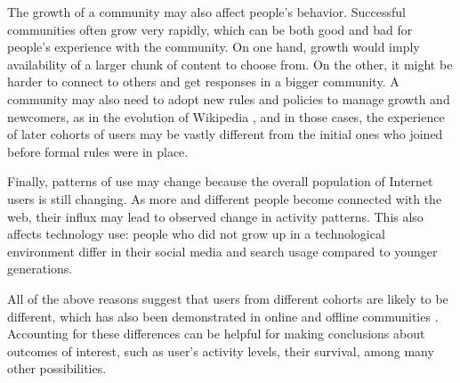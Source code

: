 The growth of a community may also affect people's behavior. Successful communities often grow very rapidly, which can be both good and bad for people's experience with the community. On one hand, growth would imply availability of a larger chunk of content to choose from. On the other, it might be harder to connect to others and get responses in a bigger community. A community may also need to adopt new rules and policies to manage growth and newcomers, as in the evolution of Wikipedia \cite{Choi2010,Bryant2005}, and in those cases, the experience of later cohorts of users may be vastly different from the initial ones who joined before formal rules were in place. 

Finally, patterns of use may change because the overall population of Internet users is still changing. As more and different people become connected with the web, their influx may lead to observed change in activity patterns.  This also affects technology use: people who did not grow up in a technological environment differ in their social media and search usage compared to younger generations\cite{Correa2010,Beldona2005}. 

All of the above reasons suggest that users from different cohorts are likely to be different, which has also been demonstrated in online and offline communities \cite{Ryder1965,Danescu-niculescu-mizil2013,Prensky2001,Correa2010}. Accounting for these differences can be helpful for making conclusions about outcomes of interest, such as user's activity levels, their survival, among many other possibilities.



